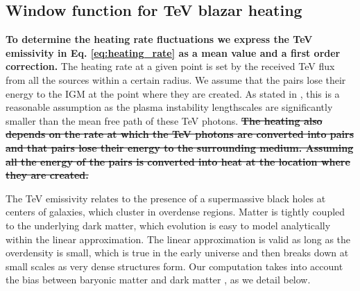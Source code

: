 \documentclass[twocolumns]{emulateapj}
\newcommand\ALc[1]{{\color{red} \bf #1}} %
\newcommand\Pc[1]{{\color{cyan} \bf #1}} %
\begin{document}
{\subsection{Window function for TeV blazar heating}
\ALc{ To determine the heating rate fluctuations we express the TeV emissivity in Eq. \ref{eq:heating_rate} as a mean value and a first order correction.} The heating rate at a given point is set by the received TeV flux from all the sources within a certain radius. We assume that the pairs lose their energy to the IGM at the point where they are created.  As stated in \citet{2012ApJ...752...22B}, this is a reasonable assumption as the plasma instability lengthscales are significantly smaller than the mean free path of these TeV photons. \ALc{\sout{The heating also depends on the rate at which the TeV photons are converted into pairs and that pairs lose their energy to the surrounding medium.  Assuming all the energy of the pairs is converted into heat at the location where they are created.}}


 The TeV emissivity relates to the presence of a supermassive black holes at centers of galaxies, which cluster in overdense regions. Matter is tightly coupled to the underlying dark matter, which evolution is easy to model analytically within the linear approximation.  The linear approximation is valid as long as the overdensity is small, which is true in the early universe and then breaks down at small scales as very dense structures form.  Our computation takes into account the bias between baryonic matter and dark matter \citep{1996MNRAS.282..347M}, as we detail below.

}
\end{document}
